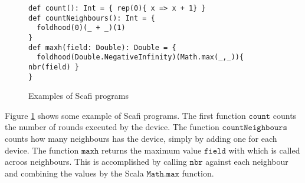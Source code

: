 \begin{figure}[t]
\begin{lstlisting}[language={scafi},frame=single,emph={count, maxh}]
def count(): Int = { rep(0){ x => x + 1} }
def countNeighbours(): Int = {
  foldhood(0)(_ + _)(1)
}
def maxh(field: Double): Double = { 
  foldhood(Double.NegativeInfinity)(Math.max(_,_)){ nbr(field) } 
}
\end{lstlisting}
\caption{Examples of Scafi programs}\label{fig:scafiexample}
\end{figure}

Figure \ref{fig:scafiexample} shows some example of Scafi programs. The first function $\mathtt{count}$ counts the number of rounds executed by the device. The function $\mathtt{countNeighbours}$ counts how many neighbours has the device, simply by adding one for each device. The function $\mathtt{maxh}$ returns the maximum value $\mathtt{field}$ with which is called acroos neighbours. This is accomplished by calling $\mathtt{nbr}$ against each neighbour and combining the values by the Scala $\mathtt{Math.max}$ function.